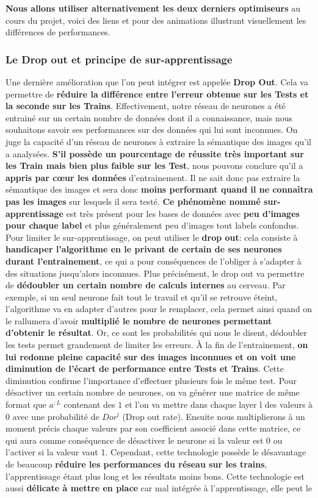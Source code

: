 \documentclass[12pt,a4paper]{extarticle}
\begin{document}
\textbf{Nous allons utiliser alternativement les deux derniers optimiseurs} au cours du projet, voici des liens \cite{optimiseur2} et \cite{optimiseur3} pour des animations illustrant visuellement les différences de performances.

\subsubsection{Le Drop out et principe de sur-apprentissage}

Une dernière amélioration que l'on peut intégrer est appelée \textbf{Drop Out}. Cela va permettre de \textbf{réduire la différence entre l'erreur obtenue sur les Tests et la seconde sur les Trains}. Effectivement, notre réseau de neurones a été entrainé sur un certain nombre de données dont il a connaissance, mais nous souhaitons savoir ses performances sur des données qui lui sont inconnues. On juge la capacité d'un réseau de neurones à extraire la sémantique des images qu'il a analysées. \textbf{S'il possède un pourcentage de réussite très important sur les Train mais bien plus faible sur les Test}, nous pouvons conclure qu'il a \textbf{appris par cœur les données} d'entrainement. Il ne sait donc pas extraire la sémantique des images et sera donc \textbf{moins performant quand il ne connaîtra pas les images} sur lesquels il sera testé. \textbf{Ce phénomène nommé sur-apprentissage} est très présent pour les bases de données avec \textbf{peu d'images pour chaque label} et plus généralement peu d'images tout labels confondus. Pour limiter le sur-apprentissage, on peut utiliser le \textbf{drop out}: cela consiste à \textbf{handicaper l'algorithme en le privant de certain de ses neurones durant l'entrainement}, ce qui a pour conséquences de l'obliger à s'adapter à des situations jusqu'alors inconnues. Plus précisément, le drop out va permettre de \textbf{dédoubler un certain nombre de calculs internes} au cerveau. Par exemple, si un seul neurone fait tout le travail et qu'il se retrouve éteint, l'algorithme va en adapter d'autres pour le remplacer, cela permet ainsi quand on le rallumera d'avoir \textbf{multiplié le nombre de neurones permettant d'obtenir le résultat}. Or, ce sont les probabilités qui nous le disent, dédoubler les tests permet grandement de limiter les erreurs. À la fin de l'entrainement, \textbf{on lui redonne pleine capacité sur des images inconnues et on voit une diminution de l'écart de performance entre Tests et Trains}. Cette diminution confirme l'importance d'effectuer plusieurs fois le même test. Pour désactiver un certain nombre de neurones, on va générer une matrice de même format que $a^{:L}$ contenant des $1$ et l'on va mettre dans chaque layer l des valeurs à $0$ avec une probabilité de $Dor^l$ (Drop out rate). Ensuite nous multiplierons à un moment précis chaque valeurs par son coefficient associé dans cette matrice, ce qui aura comme conséquence de désactiver le neurone si la valeur est 0 ou l'activer si la valeur vaut 1. Cependant, cette technologie possède le désavantage de beaucoup \textbf{réduire les performances du réseau sur les trains}, l'apprentissage étant plus long et les résultats moins bons. Cette technologie est aussi \textbf{délicate à mettre en place} car mal intégrée à l'apprentissage, elle peut le 
\end{document}
